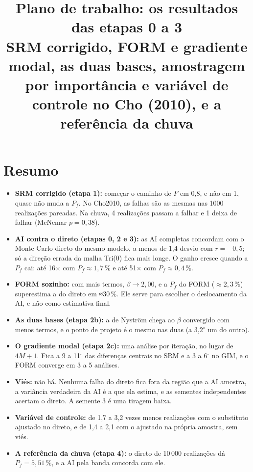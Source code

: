\documentclass[11pt,a4paper]{article}
\title{Plano de trabalho: os resultados das etapas 0 a 3\\\large SRM corrigido, FORM e gradiente modal, as duas bases,
amostragem por importância e variável de controle no Cho (2010), e a referência da chuva}
\date{\versao}
\begin{document}
\maketitle
\tableofcontents

\section*{Resumo}
\begin{itemize}
  \item \textbf{SRM corrigido (etapa 1):} começar o caminho de $F$ em 0,8, e não em 1, quase não muda a $P_f$. No
    Cho2010, as falhas são as mesmas nas 1000 realizações pareadas. Na chuva, 4 realizações passam a falhar e 1 deixa de falhar (McNemar
    $p = 0{,}38$).
  \item \textbf{AI contra o direto (etapas 0, 2 e 3):} as AI completas concordam com o Monte Carlo direto do mesmo modelo,
    a menos de 1{,}4 desvio com $r = -0{,}5$; só a direção errada da malha Tri(0) fica mais
    longe. O ganho cresce quando a $P_f$ cai: até 16$\times$ com
    $P_f \approx 1{,}7\,\%$ e até 51$\times$ com
    $P_f \approx 0{,}4\,\%$.
  \item \textbf{FORM sozinho:} com mais termos, $\beta \to 2{,}00$, e a $P_f$ do FORM ($\approx 2{,}3\,\%$) superestima
    a do direto em ≈30\,\%. Ele serve para escolher o deslocamento da AI, e não como estimativa final.
  \item \textbf{As duas bases (etapa 2b):} a de Nyström chega ao $\beta$ convergido com menos termos, e o ponto de projeto
    é o mesmo nas duas (a 3{,}2$^\circ$ um do outro).
  \item \textbf{O gradiente modal (etapa 2c):} uma análise por iteração, no lugar de $4M + 1$. Fica a 9 a 11$^\circ$ das
    diferenças centrais no SRM e a 3 a 6$^\circ$ no GIM, e o FORM converge em 3 a 5 análises.
  \item \textbf{Viés:} não há. Nenhuma falha do direto fica fora da região que a AI amostra, a variância verdadeira da AI
    é a que ela estima, e as sementes independentes acertam o direto. A semente 3 é uma tiragem baixa.
  \item \textbf{Variável de controle:} de 1{,}7 a 3{,}2 vezes menos
    realizações com o substituto ajustado no direto, e de 1{,}4 a 2{,}1 com o ajustado na própria amostra, sem viés.
  \item \textbf{A referência da chuva (etapa 4):} o direto de 10\,000
    realizações dá $P_f = 5{,}51\,\%$, e a AI pela banda concorda com ele.
\end{itemize}
\end{document}
